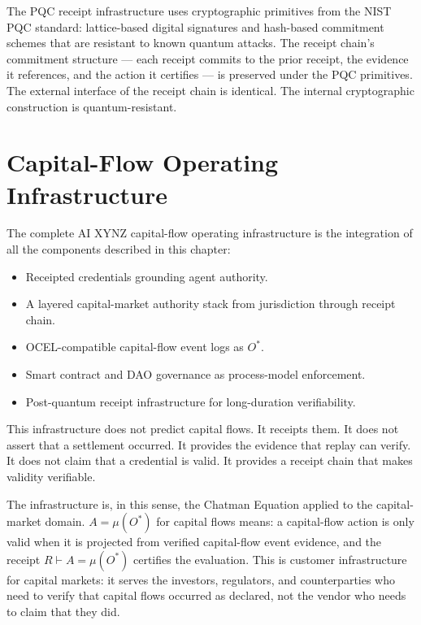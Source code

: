 The PQC receipt infrastructure uses cryptographic primitives from the NIST PQC standard: lattice-based digital signatures and hash-based commitment schemes that are resistant to known quantum attacks. The receipt chain's commitment structure --- each receipt commits to the prior receipt, the evidence it references, and the action it certifies --- is preserved under the PQC primitives. The external interface of the receipt chain is identical. The internal cryptographic construction is quantum-resistant.

\section{Capital-Flow Operating Infrastructure}

The complete AI XYNZ capital-flow operating infrastructure is the integration of all the components described in this chapter:

\begin{itemize}
  \item Receipted credentials grounding agent authority.
  \item A layered capital-market authority stack from jurisdiction through receipt chain.
  \item OCEL-compatible capital-flow event logs as $O^{*}$.
  \item Smart contract and DAO governance as process-model enforcement.
  \item Post-quantum receipt infrastructure for long-duration verifiability.
\end{itemize}

This infrastructure does not predict capital flows. It receipts them. It does not assert that a settlement occurred. It provides the evidence that replay can verify. It does not claim that a credential is valid. It provides a receipt chain that makes validity verifiable.

The infrastructure is, in this sense, the Chatman Equation applied to the capital-market domain. $A = \mu(O^{*})$ for capital flows means: a capital-flow action is only valid when it is projected from verified capital-flow event evidence, and the receipt $R \vdash A = \mu(O^{*})$ certifies the evaluation. This is customer infrastructure for capital markets: it serves the investors, regulators, and counterparties who need to verify that capital flows occurred as declared, not the vendor who needs to claim that they did.
